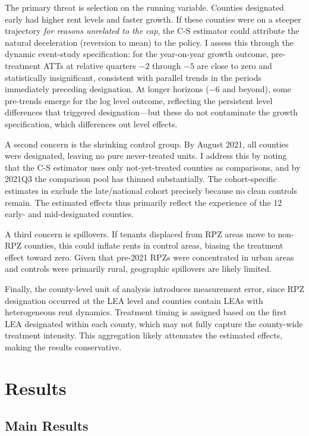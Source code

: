 \documentclass[12pt]{article}
\begin{document}
The primary threat is selection on the running variable. Counties designated early had higher rent levels and faster growth. If these counties were on a steeper trajectory \textit{for reasons unrelated to the cap}, the C-S estimator could attribute the natural deceleration (reversion to mean) to the policy. I assess this through the dynamic event-study specification: for the year-on-year growth outcome, pre-treatment ATTs at relative quarters $-2$ through $-5$ are close to zero and statistically insignificant, consistent with parallel trends in the periods immediately preceding designation. At longer horizons ($-6$ and beyond), some pre-trends emerge for the log level outcome, reflecting the persistent level differences that triggered designation---but these do not contaminate the growth specification, which differences out level effects.

A second concern is the shrinking control group. By August 2021, all counties were designated, leaving no pure never-treated units. I address this by noting that the C-S estimator uses only not-yet-treated counties as comparisons, and by 2021Q3 the comparison pool has thinned substantially. The cohort-specific estimates in  exclude the late/national cohort precisely because no clean controls remain. The estimated effects thus primarily reflect the experience of the 12 early- and mid-designated counties.

A third concern is spillovers. If tenants displaced from RPZ areas move to non-RPZ counties, this could inflate rents in control areas, biasing the treatment effect toward zero. Given that pre-2021 RPZs were concentrated in urban areas and controls were primarily rural, geographic spillovers are likely limited.

Finally, the county-level unit of analysis introduces measurement error, since RPZ designation occurred at the LEA level and counties contain LEAs with heterogeneous rent dynamics. Treatment timing is assigned based on the first LEA designated within each county, which may not fully capture the county-wide treatment intensity. This aggregation likely attenuates the estimated effects, making the results conservative.


\section{Results}
\label{sec:results}

\subsection{Main Results}
\end{document}
